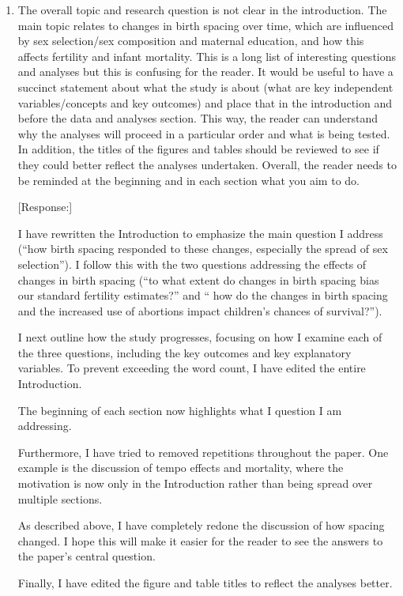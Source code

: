 \documentclass[letterpaper,12pt]{article}
\begin{document}
\begin{enumerate}

\item The overall topic and research question is not clear in the
introduction. The main topic relates to changes in birth spacing over
time, which are influenced by sex selection/sex composition and maternal
education, and how this affects fertility and infant mortality. This is
a long list of interesting questions and analyses but this is confusing
for the reader. It would be useful to have a succinct statement about
what the study is about (what are key independent variables/concepts and
key outcomes) and place that in the introduction and before the data and
analyses section. This way, the reader can understand why the analyses
will proceed in a particular order and what is being tested. In
addition, the titles of the figures and tables should be reviewed to see
if they could better reflect the analyses undertaken. Overall, the
reader needs to be reminded at the beginning and in each section what
you aim to do.

[Response:] 

I have rewritten the Introduction to emphasize the main question I address (``how birth 
spacing responded to these changes, especially the spread of sex selection'').
I follow this with the two questions addressing the effects of changes in 
birth spacing (``to what extent do changes in birth spacing bias our standard fertility 
estimates?'' and `` how do the changes in birth spacing and the increased use of abortions 
impact children's chances of survival?'').

I next outline how the study progresses, focusing on how I examine each of the three 
questions, including the key outcomes and key explanatory variables. 
To prevent exceeding the word count, I have edited the entire Introduction. 

The beginning of each section now highlights what I question I am addressing.

Furthermore, I have tried to removed repetitions throughout the paper. 
One example is the discussion of tempo effects and mortality, where the motivation is now 
only in the Introduction rather than being spread over multiple sections.

As described above, I have completely redone the discussion of how spacing changed.
I hope this will make it easier for the reader to see the answers to the paper's central 
question.

Finally, I have edited the figure and table titles to reflect the analyses better.




\end{enumerate}
\end{document}
